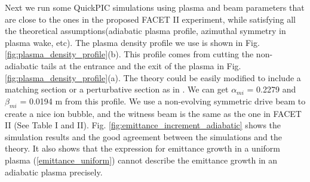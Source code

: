 \documentclass[%
reprint, superscriptaddress,
 amsmath,amssymb, aps,
prstab,
]{revtex4-2}
\begin{document}
Next we run some QuickPIC simulations using plasma and beam parameters that are close to the ones in the proposed FACET II experiment, while satisfying all the theoretical assumptions(adiabatic plasma profile, azimuthal symmetry in plasma wake, etc). The plasma density profile we use is shown in Fig. \ref{fig:plasma_density_profile}(b). This profile comes from cutting the non-adiabatic tails at the entrance and the exit of the plasma in Fig. \ref{fig:plasma_density_profile}(a). The theory could be easily modified to include a matching section \cite{Xinlu2016} or a perturbative section as in \cite{Robert}. We can get $\alpha_{mi}$ = 0.2279 and $\beta_{mi}$ = 0.0194 m from this profile. We use a non-evolving symmetric drive beam to create a nice ion bubble, and the witness beam is the same as the one in FACET II (See Table I and II). Fig. \ref{fig:emittance_increment_adiabatic} shows the simulation results and the good agreement between the simulations and the theory. It also shows that the expression for emittance growth in a uniform plasma (\ref{emittance_uniform}) cannot describe the emittance growth in an adiabatic plasma precisely.
\end{document}
